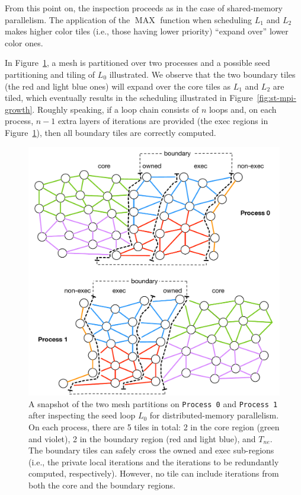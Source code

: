 From this point on, the inspection proceeds as in the case of shared-memory parallelism. The application of the $\operatorname{MAX}$ function when scheduling $L_1$ and $L_2$ makes higher color tiles (i.e., those having lower priority) ``expand over'' lower color ones. 

In Figure~\ref{fig:st-mpi-init}, a mesh is partitioned over two processes and a possible seed partitioning and tiling of $L_0$ illustrated. We observe that the two boundary tiles (the red and light blue ones) will expand over the core tiles as $L_1$ and $L_2$ are tiled, which eventually results in the scheduling illustrated in Figure~\ref{fig:st-mpi-growth}. Roughly speaking, if a loop chain consists of $n$ loops and, on each process, $n-1$ extra layers of iterations are provided (the exec regions in Figure~\ref{fig:st-mpi-init}), then all boundary tiles are correctly computed. 

\begin{figure}[thpb]
\centering
\includegraphics[scale=0.6]{sparsetiling/figures/mpi_loop0.pdf}
\caption{A snapshot of the two mesh partitions on {\tt Process 0} and {\tt Process 1} after inspecting the seed loop $L_0$ for distributed-memory parallelism. On each process, there are 5 tiles in total: 2 in the core region (green and violet), 2 in the boundary region (red and light blue), and $T_{ne}$. The boundary tiles can safely cross the owned and exec sub-regions (i.e., the private local iterations and the iterations to be redundantly computed, respectively). However, no tile can include iterations from both the core and the boundary regions. }
\label{fig:st-mpi-init}
\end{figure}

